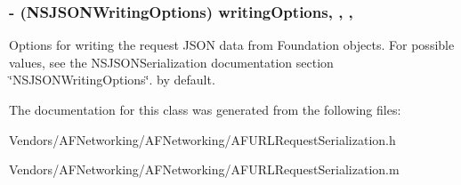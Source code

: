 \subsubsection[{writing\+Options}]{\setlength{\rightskip}{0pt plus 5cm}-\/ (N\+S\+J\+S\+O\+N\+Writing\+Options) writing\+Options\hspace{0.3cm}{\ttfamily [read]}, {\ttfamily [write]}, {\ttfamily [nonatomic]}, {\ttfamily [assign]}}\label{interface_a_f_j_s_o_n_request_serializer_ab69cc530353247cdd51d60279acc4e55}
Options for writing the request J\+S\+O\+N data from Foundation objects. For possible values, see the {\ttfamily N\+S\+J\+S\+O\+N\+Serialization} documentation section \char`\"{}\+N\+S\+J\+S\+O\+N\+Writing\+Options\char`\"{}. {} by default. 

The documentation for this class was generated from the following files\+:\begin{DoxyCompactItemize}
\item 
Vendors/\+A\+F\+Networking/\+A\+F\+Networking/A\+F\+U\+R\+L\+Request\+Serialization.\+h\item 
Vendors/\+A\+F\+Networking/\+A\+F\+Networking/A\+F\+U\+R\+L\+Request\+Serialization.\+m\end{DoxyCompactItemize}
